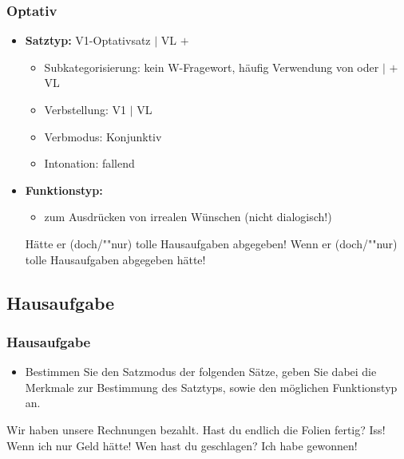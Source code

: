 \begin{frame}
\frametitle{Optativ}

\begin{itemize}
	\item \textbf{Satztyp:} V1-Optativsatz $|$ VL $+$ 
	\begin{itemize}
		\item Subkategorisierung: kein W-Fragewort, häufig Verwendung von  oder  $|$  $+$ VL
		\item Verbstellung: V1 $|$ VL
		\item Verbmodus: Konjunktiv
		\item Intonation: fallend
	\end{itemize}
	\item \textbf{Funktionstyp:}
	\begin{itemize}
		\item zum Ausdrücken von irrealen Wünschen (nicht dialogisch!)
	\end{itemize}
	
	\eal
	\ex Hätte er (doch/""nur) tolle Hausaufgaben abgegeben! 
	\ex Wenn er (doch/""nur) tolle Hausaufgaben abgegeben hätte!
	\zl
		
\end{itemize}

\end{frame}


\subsection{Hausaufgabe}


\begin{frame}
\frametitle{Hausaufgabe}

\begin{itemize}
	\item Bestimmen Sie den Satzmodus der folgenden Sätze, geben Sie dabei die Merkmale zur Bestimmung des Satztyps, sowie den möglichen Funktionstyp an. 
\end{itemize}


\ea \label{ex:Rechnung} Wir haben unsere Rechnungen bezahlt. 
\ex \label{ex:Folien} Hast du endlich die Folien fertig?
\ex \label{ex:Iss} Iss!
\ex \label{ex:Geld} Wenn ich nur Geld hätte!
\ex \label{ex:geschlagen} Wen hast du geschlagen?
\ex \label{ex:gewonnen} Ich habe gewonnen!
\z

\end{frame}


